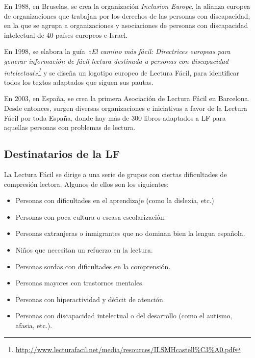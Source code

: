 En 1988, en Bruselas, se crea la organización \textit{Inclusion Europe}, la alianza europea de organizaciones que trabajan por los derechos de las personas con discapacidad, en la que se agrupa a organizaciones y asociaciones de personas con discapacidad intelectual de 40 países europeos e Israel.

En 1998, se elabora la guía \textit{«El camino más fácil: Directrices europeas para generar información de fácil lectura destinada a personas con discapacidad intelectual»\footnote{\href{http://www.lecturafacil.net/media/resources/ILSMHcastell\%C3\%A0.pdf}{http://www.lecturafacil.net/media/resources/ILSMHcastell\%C3\%A0.pdf}}} y se diseña un logotipo europeo de Lectura Fácil, para identificar todos los textos adaptados que siguen sus pautas.

En 2003, en España, se crea la primera Asociación de Lectura Fácil en Barcelona. Desde entonces, surgen diversas organizaciones e iniciativas a favor de la Lectura Fácil por toda España, donde hay más de 300 libros adaptados a LF para aquellas personas con problemas de lectura.

\subsection{Destinatarios de la LF}
La Lectura Fácil se dirige a una serie de grupos con ciertas dificultades de compresión lectora. Algunos de ellos son los siguientes: 
\begin{itemize}
	\item Personas con dificultades en el aprendizaje (como la dislexia, etc.)
	\item Personas con poca cultura o escasa escolarización.
	\item Personas extranjeras o inmigrantes que no dominan bien la lengua española.
	\item Niños que necesitan un refuerzo en la lectura.
	\item Personas sordas con dificultades en la comprensión.
	\item Personas mayores con trastornos mentales.
	\item Personas con hiperactividad y  déficit de atención. 
	\item Personas con discapacidad intelectual o del desarrollo (como el autismo, afasia, etc.). 
\end{itemize}


